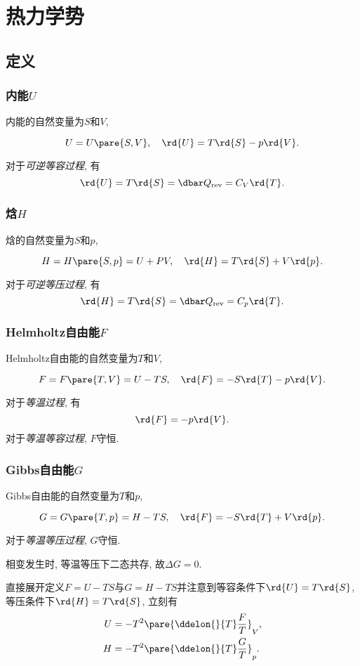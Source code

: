 \documentclass[../Thermal.tex]{subfiles}
\begin{document}
\section{热力学势}
\subsection{定义}
\subsubsection{内能\texorpdfstring{$U$}{U}}
内能的自然变量为$S$和$V$,
\begin{finale}
\[ U = U\pare{S,V},\quad \rd{U} = T\rd{S} - p\rd{V}. \]
\end{finale}
对于\emph{可逆等容过程}, 有
\[ \rd{U} = T\rd{S} = \dbar Q_{\mathrm{rev}} = C_V \rd{T}. \]
\subsubsection{焓\texorpdfstring{$H$}{H}}
焓的自然变量为$S$和$p$,
\begin{finale}
\[ H = H\pare{S,p} = U + PV,\quad \rd{H} = T\rd{S} + V\rd{p}. \]
\end{finale}
对于\emph{可逆等压过程}, 有
\[ \rd{H} = T\rd{S} = \dbar Q_{\mathrm{rev}} = C_p \rd{T}. \]
\subsubsection{Helmholtz自由能\texorpdfstring{$F$}{F}}
Helmholtz自由能的自然变量为$T$和$V$,
\begin{finale}
\[ F = F\pare{T,V} = U - TS,\quad \rd{F} = -S\rd{T} - p\rd{V}. \]
\end{finale}
对于\emph{等温过程}, 有
\begin{equation}
\label{eq:F=-pdV}
\rd{F} = -p\rd{V}.
\end{equation}
对于\emph{等温等容过程}, $F$守恒.
\subsubsection{Gibbs自由能\texorpdfstring{$G$}{G}}
Gibbs自由能的自然变量为$T$和$p$,
\begin{finale}
\[ G = G\pare{T,p} = H - TS,\quad \rd{F} = -S\rd{T} + V\rd{p}. \]
\end{finale}
对于\emph{等温等压过程}, $G$守恒.
\begin{ex}
相变发生时, 等温等压下二态共存, 故$\Delta G = 0$.
\end{ex}
\begin{ex}
直接展开定义$F=U-TS$与$G=H-TS$并注意到等容条件下$\rd{U}=T\rd{S}$, 等压条件下$\rd{H} = T\rd{S}$, 立刻有
\begin{align}
U &= -T^2\pare{\ddelon{}{T}\frac{F}{T}}_V, \\
\label{eq:hbyddg}
H &= -T^2\pare{\ddelon{}{T}\frac{G}{T}}_p.
\end{align}
\end{ex}
\end{document}
